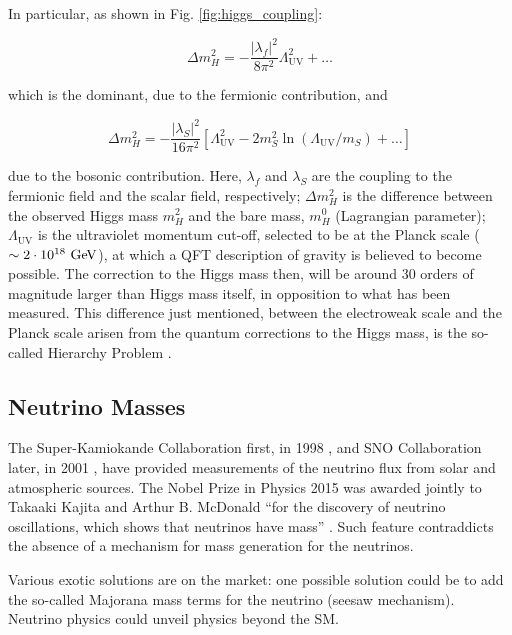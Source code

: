 			In particular, as shown in Fig. \ref{fig:higgs_coupling}:

			\begin{equation}
			\label{eq:mH_fermionic_contribution}
			\Delta m_H^2 = - \frac{ | \lambda_f  |^2}{8 \pi ^2} \Lambda_{\mathrm{UV}}^2 + \dots 
			\end{equation}

			\noindent which is the dominant, due to the fermionic contribution, and 

			\begin{equation}
			\label{eq:mH_scalar_contribution}
			\Delta m_H^2 = - \frac{\left | \lambda_S \right |^2}{16 \pi ^2} \left [  \Lambda_{\mathrm{UV}}^2 - 2m_S^2 \ln \left (\Lambda_{\mathrm{UV}} / m_S \right) + \dots \right ]
			\end{equation}

			\noindent due to the bosonic contribution. Here, $\lambda_f$ and $\lambda_S$ are the coupling to the fermionic field and the scalar field, respectively; $\Delta m_H^2$ is the difference between the observed Higgs mass $m_H^2$ and the bare mass, $m_H^0$ (Lagrangian parameter); $\Lambda_{\mathrm{UV}}$ is the ultraviolet momentum cut-off, selected to be at the Planck scale ($\sim 2 \cdot 10^{18} \gev$), at which a QFT description of gravity is believed to become possible. The correction to the Higgs mass then, will be around 30 orders of magnitude larger than Higgs mass itself, in opposition to what has been measured. This difference just mentioned, between the electroweak scale and the Planck scale arisen from the quantum corrections to the Higgs mass, is the so-called Hierarchy Problem \cite{Weinberg1976}.


		\subsection*{Neutrino Masses}

			The Super-Kamiokande Collaboration first, in 1998 \cite{SK1998}, and SNO Collaboration later, in 2001 \cite{SNO2001}, have provided measurements of the neutrino flux from solar and atmospheric sources. 
			The Nobel Prize in Physics 2015 was awarded jointly to Takaaki Kajita and Arthur B. McDonald ``for the discovery of neutrino oscillations, which shows that neutrinos have mass'' \cite{Nobel2015}. Such feature contraddicts the absence of a mechanism for mass generation for the neutrinos. 

			Various exotic solutions are on the market: one possible solution could be to add the so-called Majorana mass terms for the neutrino (seesaw mechanism). Neutrino physics could unveil physics beyond the SM.



